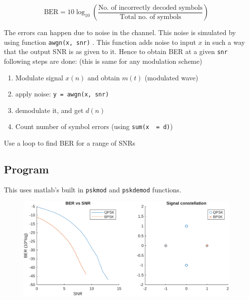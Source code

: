 $$\text{BER} = 10\log_{10} \left(\frac{\text {No. of incorrectly decoded symbols}}{\text{Total no. of symbols}}\right)$$

The errors can happen due to noise in the channel.
This noise is simulated by using function \texttt{awgn(x, snr)} .
This function adds noise to input $x$ in such a way that the output SNR is as given to it.
Hence to obtain BER at a given \texttt{snr} following steps are done: (this is same for any modulation scheme)
\begin{enumerate}
	\item Modulate signal $x(n)$ and obtain $m(t)$ (modulated wave)
	\item apply noise: \texttt{y = awgn(x, snr)} 
	\item demodulate it, and get $d(n)$
	\item Count number of symbol errors (using \texttt{sum(x ~= d)})
\end{enumerate}

{\setlength{\parindent}{0pt} Use a loop to find BER for a range of SNRs}

\subsection*{Program}
This uses matlab's built in \texttt{pskmod} and \texttt{pskdemod} functions.



\begin{figure}[!ht]
	\centering
	\includegraphics[width=\linewidth]{img/psk_perf.pdf}
\end{figure}

